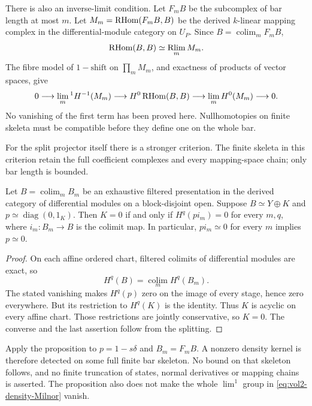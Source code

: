 There is also an inverse-limit condition. Let
$F_mB$ be the subcomplex of bar length at most $m$.
Let $M_m=\operatorname{RHom}(F_mB,B)$ be the derived $k$-linear mapping
complex in the differential-module category on $U_P$.
Since $B=\operatorname*{colim}_mF_mB$,
\[
 \operatorname{RHom}(B,B)\simeq\operatorname*{Rlim}_mM_m.
\]
The fibre model of $1-\mathrm{shift}$ on
$\prod_mM_m$, and exactness of products of vector
spaces, give
\begin{equation}\label{eq:vol2-density-Milnor}
 0\longrightarrow\lim_m{}^1 H^{-1}(M_m)
 \longrightarrow H^0\operatorname{RHom}(B,B)
 \longrightarrow\lim_mH^0(M_m)\longrightarrow0.
\end{equation}
No vanishing of the first term has been proved here.
Nullhomotopies on finite skeleta must be compatible
before they define one on the whole bar.

For the split projector itself there is a stronger criterion.
The finite skeleta in this criterion retain the full coefficient
complexes and every mapping-space chain; only bar length is bounded.

\begin{proposition}\label{prop:vol2-projector-skeleta}
Let $B=\operatorname*{colim}_m B_m$ be an exhaustive filtered
presentation in the derived category of differential modules on
a block-disjoint open. Suppose $B\simeq Y\oplus K$ and
$p\simeq\operatorname{diag}(0,1_K)$.
Then $K=0$ if and only if $H^q(p i_m)=0$ for every $m,q$,
where $i_m:B_m\to B$ is the colimit map.
In particular, $p i_m\simeq0$ for every $m$ implies $p\simeq0$.
\end{proposition}
\begin{proof}
On each affine ordered chart, filtered colimits of differential
modules are exact, so
\[
 H^q(B)=\operatorname*{colim}_mH^q(B_m).
\]
The stated vanishing makes $H^q(p)$ zero on the image of every
stage, hence zero everywhere. But its restriction to $H^q(K)$
is the identity. Thus $K$ is acyclic on every affine chart.
Those restrictions are jointly conservative, so $K=0$.
The converse and the last assertion follow from the splitting.
\end{proof}

Apply the proposition to $p=1-s\delta$ and $B_m=F_mB$.
A nonzero density kernel is therefore detected on some full
finite bar skeleton. No bound on that skeleton follows, and no
finite truncation of states, normal derivatives or mapping chains
is asserted. The proposition also does not make the whole
$\lim^1$ group in \eqref{eq:vol2-density-Milnor} vanish.

